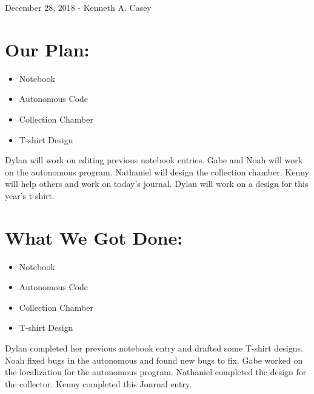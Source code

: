 \documentclass[12pt]{article}
\begin{document}
December 28, 2018 - Kenneth A. Casey 
\section{Our Plan:} %
\begin{itemize}
	\item Notebook

	\item Autonomous Code

	\item Collection Chamber

	\item T-shirt Design

\end{itemize}

Dylan will work on editing previous notebook entries. Gabe and Noah will work on the autonomous program. Nathaniel will design the collection chamber. Kenny will help others and work on today’s journal. Dylan will work on a design for this year’s t-shirt.

\section{What We Got Done:} %
\begin{itemize}
	\item Notebook

	\item Autonomous Code

	\item Collection Chamber

	\item T-shirt Design

	\end{itemize}


Dylan completed her previous notebook entry and drafted some T-shirt designs. Noah fixed bugs in the autonomous and found new bugs to fix. Gabe worked on the localization for the autonomous program. Nathaniel completed the design for the collector. Kenny completed this Journal entry. 
\end{document}
